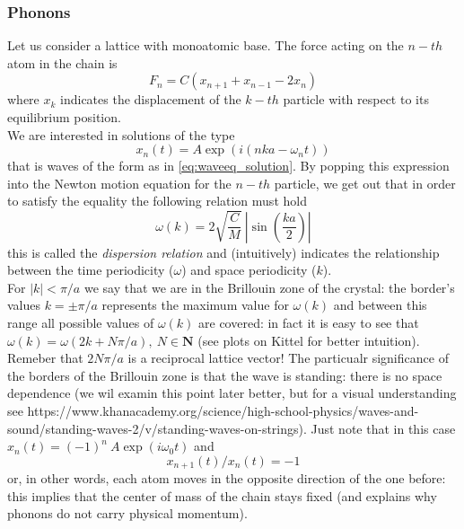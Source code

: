 \subsubsection*{Phonons}
Let us consider a lattice with monoatomic base. The force acting on the $n-th$ atom in the chain is 
$$F_n = C\left(x_{n+1} + x_{n-1} - 2 x_n\right)$$
where $x_k$ indicates the displacement of the $k-th$ particle with respect to its equilibrium position. \\
We are interested in solutions of the type 
\begin{equation*}
    x_n(t) = A \exp\left(i(nka - \omega_n t)\right)
\end{equation*}
that is waves of the form as in \ref{eq:waveeq_solution}. By popping this expression into the Newton motion equation for the $n-th$ particle,
we get out that in order to satisfy the equality the following relation must hold
\begin{equation*}
    \omega(k) = 2\sqrt{\frac{C}{M}} \ \left|\sin\left(\frac{ka}{2}\right)\right|
\end{equation*}
this is called the \emph{dispersion relation} and (intuitively) indicates the relationship between the time periodicity ($\omega$) and space periodicity ($k$). \\
For $|k| < \pi/a$ we say that we are in the Brillouin zone of the crystal: the border's values $k=\pm \pi/a$ represents the maximum value for $\omega(k)$ and between 
this range all possible values of $\omega(k)$ are covered: in fact it is easy to see that $\omega(k) = \omega(2k+N\pi/a), \ N \in \mathbf{N}$ (see plots on Kittel for better intuition). Remeber that
$2N\pi/a$ is a reciprocal lattice vector! The particualr significance of the borders of the Brillouin zone is that the wave is standing: there is no space dependence (we wil examin this point later better, but for a visual 
understanding see https://www.khanacademy.org/science/high-school-physics/waves-and-sound/standing-waves-2/v/standing-waves-on-strings). Just note that in this case 
$x_n(t) = (-1)^n \ A \exp(i \omega_0 t)$ and $$x_{n+1}(t)/x_n(t) = -1$$ or, in other words, each atom moves in the opposite direction of the one before: this implies that the center of mass of the chain stays fixed
(and explains why phonons do not carry physical momentum).

